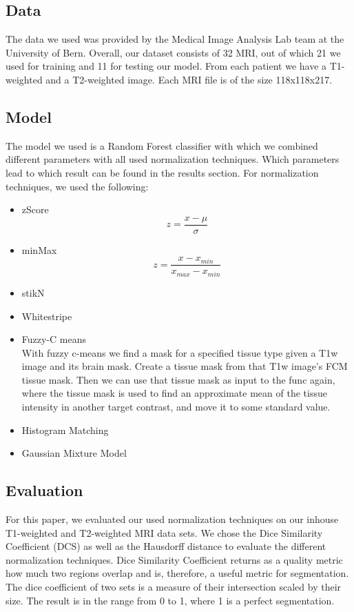 \documentclass[journal]{IEEEtran}
\begin{document}
\subsection{Data}
	The data we used was provided by the Medical Image Analysis Lab team at the University of Bern. Overall, our dataset consists of 32 MRI,
	out of which 21 we used for training and 11 for testing our model. From each patient we have a T1-weighted and a T2-weighted image. Each MRI file
	is of the size 118x118x217.
\subsection{Model}
	The model we used is a Random Forest classifier with which we combined different parameters with all used normalization techniques. Which parameters
	lead to which result can be found in the results section. For normalization techniques, we used the following:
	\begin{itemize}
		\item zScore
		\begin{equation}
			z = \frac{x - \mu}{\sigma}
		\end{equation}
		\item minMax
		\begin{equation}
			z = \frac{x - x_{min}}{x_{max} - x_{min}}
		\end{equation}
		\item stikN
		\item Whitestripe
		\item Fuzzy-C means\\
		With fuzzy c-means we find a mask for a specified tissue type given a T1w image and its brain mask. Create a tissue mask
		from that T1w image's FCM tissue mask. Then we can use that tissue mask as input to the func again, where the tissue mask is
		used to find an approximate mean of the tissue intensity in	another target contrast, and move it to some standard value.
		\item Histogram Matching
		\item Gaussian Mixture Model
	\end{itemize}
\subsection{Evaluation}
	For this paper, we evaluated our used normalization techniques on our inhouse T1-weighted and T2-weighted MRI data sets. 
	We chose the Dice Similarity Coefficient (DCS) as well as the Hausdorff distance to evaluate the different normalization techniques.
	Dice Similarity Coefficient returns as a quality metric how much two regions overlap and is, therefore, a useful metric for segmentation.
	The dice coefficient of two sets is a measure of their intersection scaled by their size. The result is in the range from 0 to 1, where 1 is a perfect segmentation. 
	
\end{document}
